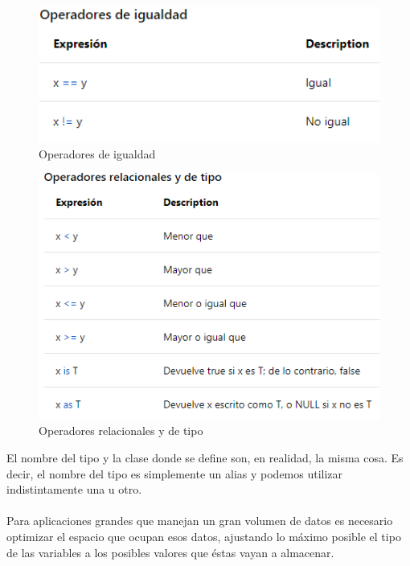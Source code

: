 \documentclass[12pt,a4paper]{report}
\begin{document}
\begin{figure}[hbtp]
\centering
\includegraphics[width=16cm]{Csh_Imagenes/op_igualdad.PNG}
\caption{Operadores de igualdad}
\end{figure}
\begin{figure}[hbtp]
\centering
\includegraphics[width=16cm]{Csh_Imagenes/op_relacionales.PNG}
\caption{Operadores relacionales y de tipo}
\end{figure}

El nombre del tipo y la clase donde se define son, en realidad, la misma cosa. Es decir, el nombre del tipo es simplemente un alias y podemos utilizar indistintamente una u otro.\\\\Para aplicaciones grandes que manejan un gran volumen de datos es necesario optimizar el espacio que ocupan esos datos, ajustando lo máximo posible el tipo de las variables a los posibles valores que éstas vayan a almacenar.
\end{document}

